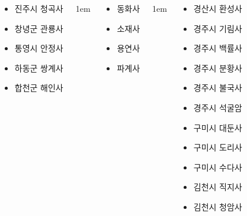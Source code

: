 \documentclass[	20pt, 
							a0paper, 
							landscape,
							margin=0mm, %
							innermargin=10mm,  		%
							blockverticalspace=4mm, %
							colspace=5mm, 
							subcolspace=0mm
							]{tikzposter}
\begin{document}
\begin{columns}
{\begin{LARGE}
\begin{itemize}
					\item 진주시 청곡사
					\item 창녕군 관룡사
					\item 통영시 안정사
					\item 하동군 쌍계사
					\item 합천군 해인사

					\end{itemize}
				\end{LARGE}
			} %



			{
					\setlength{\leftmargini}{3em}
					\setlength{\labelsep} {1em}
				\begin{LARGE}
					\begin{itemize}
					\item 동화사
					\item 소재사
					\item 용연사
					\item 파계사
					\end{itemize}
				\end{LARGE}
			} %


			{
					\setlength{\leftmargini}{4em}
					\setlength{\labelsep} {1em}
				\begin{LARGE}
					\begin{itemize}
					\item 경산시	환성사 

					\item 경주시		기림사
					\item 경주시		백률사
					\item 경주시		분황사
					\item 경주시		불국사
					\item 경주시		석굴암

					\item 구미시		대둔사
					\item 구미시		도리사
					\item 구미시		수다사


					\item 김천시		직지사
					\item 김천시		청암사
	

\end{itemize}
\end{LARGE}}
\end{columns}
\end{document}

